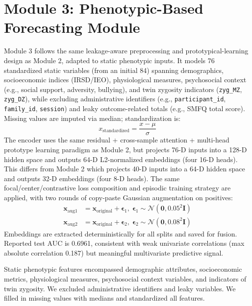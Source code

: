 \documentclass[10pt,letterpaper]{article}
\begin{document}
\section*{Module 3: Phenotypic-Based Forecasting Module}
Module 3 follows the same leakage-aware preprocessing and prototypical-learning design as Module 2, adapted to static phenotypic inputs. It models 76 standardized static variables (from an initial 84) spanning demographics, socioeconomic indices (IRSD/IEO), physiological measures, psychosocial context (e.g., social support, adversity, bullying), and twin zygosity indicators (\texttt{zyg\_MZ}, \texttt{zyg\_DZ}), while excluding administrative identifiers (e.g., \texttt{participant\_id}, \texttt{family\_id}, \texttt{session}) and leaky outcome-related totals (e.g., SMFQ total score). Missing values are imputed via median; standardization is:
\begin{equation}
x_{\text{standardized}} = \frac{x - \mu}{\sigma}
\end{equation}
The encoder uses the same residual + cross-sample attention + multi-head prototype learning paradigm as Module 2, but projects 76-D inputs into a 128-D hidden space and outputs 64-D L2-normalized embeddings (four 16-D heads). This differs from Module 2 which projects 40-D inputs into a 64-D hidden space and outputs 32-D embeddings (four 8-D heads). The same focal/center/contrastive loss composition and episodic training strategy are applied, with two rounds of copy-paste Gaussian augmentation on positives:
\begin{align}
\mathbf{x}_{\text{aug1}} &= \mathbf{x}_{\text{original}} + \boldsymbol{\epsilon}_1,\;\boldsymbol{\epsilon}_1 \sim \mathcal{N}(\mathbf{0}, 0.05^2 \mathbf{I})\\
\mathbf{x}_{\text{aug2}} &= \mathbf{x}_{\text{original}} + \boldsymbol{\epsilon}_2,\;\boldsymbol{\epsilon}_2 \sim \mathcal{N}(\mathbf{0}, 0.08^2 \mathbf{I})
\end{align}
Embeddings are extracted deterministically for all splits and saved for fusion. Reported test AUC is 0.6961, consistent with weak univariate correlations (max absolute correlation 0.187) but meaningful multivariate predictive signal.

Static phenotypic features encompassed demographic attributes, socioeconomic metrics, physiological measures, psychosocial context variables, and indicators of twin zygosity. We excluded administrative identifiers and leaky variables. We filled in missing values with medians and standardized all features.
\end{document}
